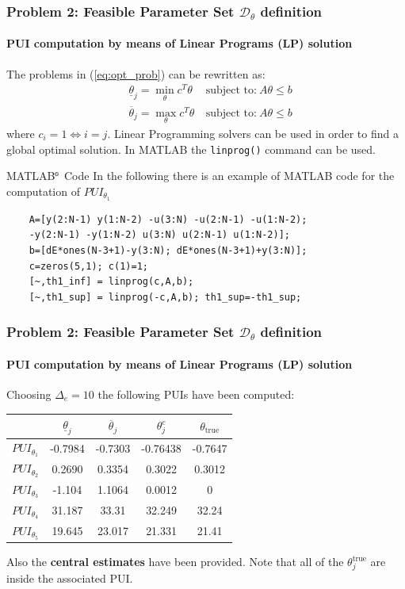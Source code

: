 \documentclass{beamer}
\begin{document}
\begin{frame}[fragile]
    \frametitle{Problem 2: Feasible Parameter Set $\mathcal{D}_\theta$ definition}
    \framesubtitle{PUI computation by means of Linear Programs (LP) solution}
    The problems in (\ref{eq:opt_prob}) can be rewritten as:
    \begin{align}
            &\underline{\theta}_j = \min_{\theta}{c^T{\theta}} \ &\text{subject to:} \ A\theta\le{b} \\
            &\overline{\theta}_j = \max_{\theta}{c^T{\theta}} \ &\text{subject to:} \ A\theta\le{b}
    \end{align}
    where $c_i=1 \iff i=j$. Linear Programming solvers can be used in order to find a \alert{global optimal solution.} In MATLAB the \texttt{linprog()} command can be used.
    \begin{exampleblock}{MATLAB$^\text{\tiny\textregistered}$ Code}\justifying
        \small
         In the following there is an example of MATLAB code for the computation of $PUI_{\theta_1}$
        {\tiny{
            \begin{verbatim}
    A=[y(2:N-1) y(1:N-2) -u(3:N) -u(2:N-1) -u(1:N-2); 
    -y(2:N-1) -y(1:N-2) u(3:N) u(2:N-1) u(1:N-2)];
    b=[dE*ones(N-3+1)-y(3:N); dE*ones(N-3+1)+y(3:N)];
    c=zeros(5,1); c(1)=1; 
    [~,th1_inf] = linprog(c,A,b); 
    [~,th1_sup] = linprog(-c,A,b); th1_sup=-th1_sup;
                        \end{verbatim}
        }}
    \end{exampleblock}
\end{frame}

\begin{frame}
    \frametitle{Problem 2: Feasible Parameter Set $\mathcal{D}_\theta$ definition}
    \framesubtitle{PUI computation by means of Linear Programs (LP) solution}

    Choosing $\Delta_e=10$ the following PUIs have been computed:
    \begin{table}
        \centering
        \begin{tabular}{c c c c c}
             &$\underline{\theta}_j$&$\overline{\theta}_j$&$\theta_j^c$&$  \theta_{\text{true}}$\\
            \hline\hline
            $PUI_{\theta_1}$\vline\vline&-0.7984&-0.7303&-0.76438&-0.7647\\
            $PUI_{\theta_2}$\vline\vline&0.2690&0.3354&0.3022&0.3012\\
            $PUI_{\theta_3}$\vline\vline&-1.104&1.1064&0.0012&0\\
            $PUI_{\theta_4}$\vline\vline&31.187&33.31&32.249&32.24\\
            $PUI_{\theta_5}$\vline\vline&19.645&23.017&21.331&21.41\\
        \end{tabular}
    \end{table}
    Also the  \textbf{central estimates} have been provided. Note that all of the $\theta_j^{\text{true}}$ are inside the associated PUI.
\end{frame}     
\end{document}
